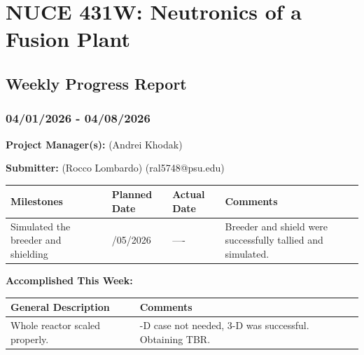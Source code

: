 \documentclass{article}
\begin{document}
{\centering \section*{NUCE 431W: Neutronics of a Fusion Plant}

\subsection*{Weekly Progress Report}

\subsubsection*{04/01/2026 - 04/08/2026}}


\hrulefill

\bigskip

\textbf{Project Manager(s):} (Andrei Khodak) 

\bigskip

\textbf{Submitter:} (Rocco Lombardo) (ral5748@psu.edu)

\bigskip

\renewcommand{\arraystretch}{1.5}
\begin{table}[H]
    \centering
    \begin{tabularx}{0.95\textwidth} { 
        | >{\centering\arraybackslash}X 
        | >{\centering\arraybackslash}X 
        | >{\centering\arraybackslash}X
        | >{\centering\arraybackslash}X | }

    \hline
    \textbf{Milestones} & \textbf{Planned Date} & \textbf{Actual Date} & \textbf{Comments} \\
    \hline
    Simulated the breeder and shielding  & 04/05/2026  & ---- & Breeder and shield were successfully tallied and simulated.    \\
    \hline
    \end{tabularx}
\end{table}

\bigskip

\textbf{Accomplished This Week: }

\renewcommand{\arraystretch}{1.5}
\begin{table}[H]
    \centering
    \begin{tabularx}{0.95\textwidth} { 
        | >{\centering\arraybackslash}X
        | >{\centering\arraybackslash}X | }

    \hline
    \textbf{General Description} & \textbf{Comments} \\
    \hline
    Whole reactor scaled properly.  & 2-D case not needed, 3-D was successful. Obtaining TBR. \\
    \hline
    \end{tabularx}
\end{table}
\end{document}

